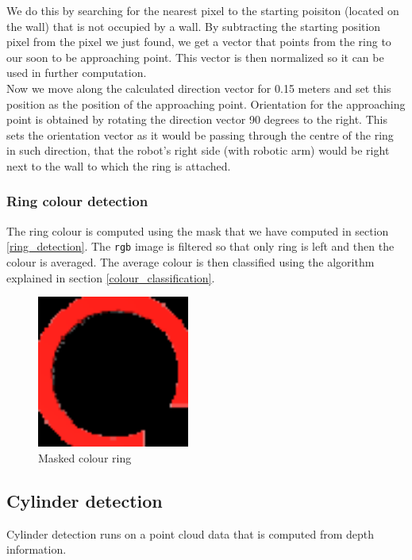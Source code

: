 \documentclass[12pt,a4paper]{article}
\begin{document}
	We do this by searching for the nearest pixel to the starting poisiton (located on the wall) that is not occupied by a wall. By subtracting the starting position pixel from the pixel we just found, we get a vector that points from the ring to our soon to be approaching point. This vector is then normalized so it can be used in further computation. \\

	Now we move along the calculated direction vector for 0.15 meters and set this position as the position of the approaching point. Orientation for the approaching point is obtained by rotating the direction vector 90 degrees to the right. This sets the orientation vector as it would be passing through the centre of the ring in such direction, that the robot's right side (with robotic arm) would be right next to the wall to which the ring is attached.

	\subsubsection{Ring colour detection}
	The ring colour is computed using the mask that we have computed in section \ref{ring_detection}. The \texttt{rgb} image is filtered so that only ring is left and then the colour is averaged. The average colour is then classified using the algorithm explained in section \ref{colour_classification}.
	
	\begin{figure}[h]
		\centering
		\includegraphics[height=5cm]{images/ring_detection_colour}
		\caption{Masked colour ring}
		\label{fig:masked_colour_ring}
	\end{figure}
		
	\subsection{Cylinder detection}
	Cylinder detection runs on a point cloud data that is computed from depth information. \\
	
\end{document}
